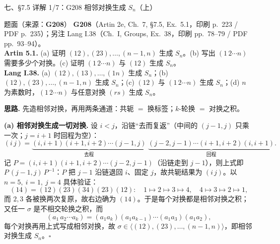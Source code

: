 \documentclass[aspectratio=169,10pt,fontset=none]{ctexbeamer}
\newcommand{\ex}[1]{\textcolor{accent}{\footnotesize\bfseries #1}}
\newcommand{\key}[1]{\textcolor{ink}{\bfseries #1}}
\begin{document}
\begin{frame}[t]{七、\S7.5 详解 1/7：G208 相邻对换生成 $S_n$（上）}
\label{ex:G208}
\scriptsize
\begin{block}{\footnotesize 题面（来源：\ex{G208}）}
\scriptsize
\ex{G208}（Artin 2e, Ch.~7, \S7.5, Ex.~5.1，印刷 p.~223 / PDF p.~235）；另注 Lang I.38（Ch.~I, Groups, Ex.~38，印刷 pp.~78--79 / PDF pp.~93--94）。\\
\key{Artin 5.1.} (a) 证明 $(12),(23),\ldots,(n-1,n)$ 生成 $S_n$。(b) 写出 $(1\,2\cdots n)$ 需要多少个对换。(c) 证明 $(1\,2\cdots n)$ 与 $(12)$ 生成 $S_n$。\\
\key{Lang I.38.} (a) $(12),(13),\ldots,(1n)$ 生成 $S_n$；(b) $(12),(23),\ldots,(n-1,n)$ 生成 $S_n$；(c) $(12)$ 与 $(1\,2\cdots n)$ 生成 $S_n$；(d) $n$ 为素数时，$(1\,2\cdots n)$ 与任意对换 $(rs)$ 生成 $S_n$。
\end{block}
\key{思路.} 先造相邻对换，再用两条通道：共轭 $=$ 换标签；$k$-轮换 $=$ 对换之积。

\key{(a) 相邻对换生成一切对换.} 设 $i<j$，沿链“去而复返”（中间的 $(j-1,j)$ 只乘一次；$j=i+1$ 时回程为空）：
\[
(i\,j)=\underbrace{(i,i+1)(i+1,i+2)\cdots(j-1,j)}_{\text{去程}}\;\underbrace{(j-2,j-1)\cdots(i+1,i+2)(i,i+1)}_{\text{回程}}.
\]
记 $P=(i,i+1)(i+1,i+2)\cdots(j-2,j-1)$（沿链走到 $j-1$），则上式即 $P\,(j-1,j)\,P^{-1}$：$P$ 把 $j-1$ 沿链退回 $i$、固定 $j$，故共轭结果为 $(i\,j)$。以 $n=5,\ i=1,\ j=4$ 具体验证：
\[ (14)=(12)(23)(34)(23)(12):\quad 1\mapsto2\mapsto3\mapsto4,\quad 4\mapsto3\mapsto2\mapsto1, \]
而 $2,3$ 各被换两次复原，故右边确为 $(14)$。于是每个对换都是相邻对换之积；又任一 $\sigma$ 是不相交轮换之积，而
\[ (a_1\,a_2\cdots a_k)=(a_1a_k)(a_1a_{k-1})\cdots(a_1a_3)(a_1a_2), \]
每个对换再用上式写成相邻对换，故 $\sigma\in\langle(12),(23),\ldots,(n-1,n)\rangle$，即相邻对换生成 $S_n$。$\square$
\end{frame}
\end{document}
